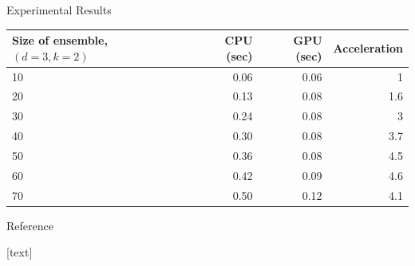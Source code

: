\documentclass[final,t]{beamer}
\begin{document}
\begin{frame}{}
\begin{columns}[t]
\begin{column}{.3\linewidth}
\begin{block}{Experimental Results}
        \begin{table}
          \centering
          \begin{tabular}{@{} p{.4\linewidth} r r r @{}}
            \toprule
            Size of ensemble, $(d=3, k=2)$      & CPU (sec)  & GPU (sec) &Acceleration \\
            \midrule
            10					& 0.06            & 0.06    & 1 	\\%
            20                                  & 0.13            & 0.08    & 1.6	\\
            30             			& 0.24            & 0.08    & 3 	\\%
            40                                  & 0.30            & 0.08    & 3.7	\\
            50                                  & 0.36            & 0.08    & 4.5	\\
            60                                  & 0.42            & 0.09    & 4.6	\\
            70                                  & 0.50            & 0.12    & 4.1	\\
            \bottomrule
          \end{tabular}
          \label{tab:baseline-results}
        \end{table}
      \end{block}
      
               

      \begin{block}{Reference}
	\small{
	[text]
	
	
}


\end{block}
\end{column}
\end{columns}
\end{frame}
\end{document}
